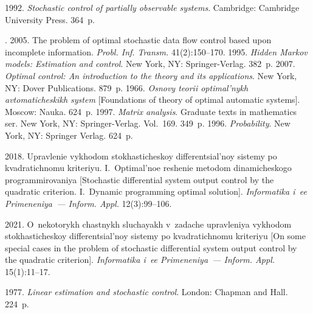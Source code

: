 \begin{multicols}{2}
{{\begin{thebibliography}{99}
       1992. \textit{Stochastic control of partially observable systems}. 
Cambridge: Cambridge University Press. 364~p.

      . 2005. The 
problem of optimal stochastic data flow control based upon incomplete information. \textit{Probl. 
Inf. Transm.} 41(2):150--170.
       1995. \textit{Hidden Markov models: 
Estimation and control}. New York, NY: Springer-Verlag. 382~p.
       2007. \textit{Optimal control: An introduction to the theory 
and its applications}. New York, NY: Dover Publications. 879~p.
       1966. \textit{Osnovy teorii optimal'nykh avtomaticheskikh system} 
[Foundations of theory of optimal automatic systems]. Moscow: Nauka. 624~p.
       1997. \textit{Matrix analysis}. 
Graduate texts in mathematics ser. New York, NY: Springer-Verlag. Vol.~169. 349~p.
       1996. \textit{Probability}. 
      New York, NY: Springer Verlag. 624~p.
      
       2018. Upravlenie vykhodom stokhasticheskoy 
differentsial'noy sistemy po kvadratichnomu kriteriyu. I.~Optimal'noe reshenie metodom 
dinamicheskogo programmirovaniya [Stochastic differential system output control by the quadratic 
criterion. I.~Dynamic programming optimal solution]. \textit{Informatika i~ee Primeneniya~--- Inform. 
Appl.} 12(3):99--106.


       2021. O~nekotorykh chastnykh sluchayakh v~zadache upravleniya 
vykhodom stokhasticheskoy differentsial'noy sistemy po kvadratichnomu kriteriyu [On some special 
cases in the problem of stochastic differential system output control by the quadratic criterion]. 
\textit{Informatika i~ee Primeneniya~--- Inform. Appl.} 15(1):11--17.

      
       1977. \textit{Linear estimation and stochastic control}. London: 
Chapman and Hall. 224~p.
      \end{thebibliography}

 }
 }

\end{multicols}

